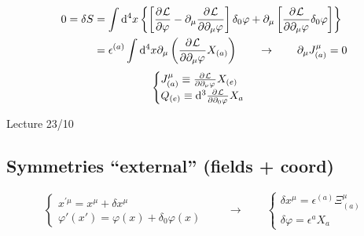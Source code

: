 \begin{align*}
0 = \delta S &= \int \operatorname{d \!}{^4 x}\left\{\left[ \frac{\partial{^{}}\mathcal{L}}{\partial{{\varphi}^{}}}  - \partial_\mu  \frac{\partial{^{}}\mathcal{L}}{\partial{{\partial_\mu \varphi}^{}}} \right]\delta_0 \varphi + \partial_\mu \left[ \frac{\partial{^{}}\mathcal{L}}{\partial{{\partial_\mu \varphi}^{}}} \delta_0 \varphi\right]\right\} \\
&= \epsilon^{(a)} \int \operatorname{d \!}{^4x}\partial_\mu \left( \frac{\partial{^{}}\mathcal{L}}{\partial{{\partial_\mu\varphi}^{}}} X_{(a)}\right) \qquad \to \qquad \partial_\mu J^\mu_{(a)} = 0
\end{align*}
\[ \begin{cases}
J^\mu_{(a)} \equiv  \frac{\partial{^{}}\mathcal{L}}{\partial{{\partial_\nu\varphi}^{}}} X_{(e)} \\
Q_{(e)} \equiv \operatorname{d \!}{^3} \frac{\partial{^{}}\mathcal{L}}{\partial{{\partial_0\varphi}^{}}} X_a
\end{cases} \]

Lecture 23/10

\subsection{Symmetries ``external'' (fields + coord)}
\[ \begin{cases}
x^{\prime\mu} = x^\mu + \delta x^\mu \\ \varphi'(x') = \varphi(x) + \delta_0\varphi(x)
\end{cases} \qquad \to \qquad \begin{cases}
\delta x^\mu = \epsilon^{(a)}\Xi^\mu_{(a)} \\ \delta \varphi = \epsilon^a X_a
\end{cases} \]

